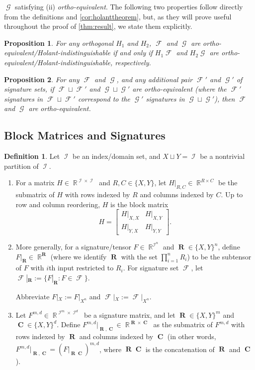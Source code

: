 \documentclass{article}
\newtheorem{proposition}{Proposition}[section]
\theoremstyle{remark}
\theoremstyle{definition}
\newtheorem{definition}{Definition}[section]
\DeclareMathOperator{\rr}{\mathbb{R}}
\DeclareMathOperator{\vr}{\mathbf{R}}
\DeclareMathOperator{\vc}{\mathbf{C}}
\DeclareMathOperator{\ic}{\mathcal{I}}
\DeclareMathOperator{\fc}{\mathcal{F}}
\DeclareMathOperator{\gc}{\mathcal{G}}
\begin{document}
$\gc$ satisfying (ii) \emph{ortho-equivalent}. 
The following two properties follow directly from the definitions and \autoref{cor:holanttheorem},
but, as they will
prove useful throughout the proof of \autoref{thm:result}, we state them explicitly.
\begin{proposition}
    For any orthogonal $H_1$ and $H_2$, $\fc$ and $\gc$ are 
    ortho-equivalent/Holant-indistinguishable if and only if
    $H_1\fc$ and $H_2\gc$ are ortho-equivalent/Holant-indistinguishable, respectively.
    \label{prop:transform}
\end{proposition}
\begin{proposition}
    For any $\fc$ and $\gc$, and any additional pair $\fc'$ and $\gc'$ of signature sets,
    if $\fc \sqcup \fc'$ and $\gc \sqcup \gc'$ are ortho-equivalent (where the $\fc'$ signatures in $\fc \sqcup \fc'$ correspond to the $\gc'$ signatures in $\gc \sqcup \gc'$), then $\fc$ and $\gc$ are ortho-equivalent.
    \label{prop:union}
\end{proposition}   

\subsection{Block Matrices and Signatures}
\label{sec:block}
\begin{definition}
    \label{def:block}
    Let $\ic$ be an index/domain set, and $X \sqcup Y = \ic$ be a nontrivial partition of $\ic$.
    \begin{enumerate}
    \item
    For a matrix $H \in \rr^{\ic \times \ic}$ and $R,C \in \{X,Y\}$, let $H|_{R,C} \in \rr^{R\times C}$ be the
    submatrix of $H$ with rows indexed by $R$ and columns indexed by $C$. Up to row and
    column reordering, $H$ is the block matrix
    \[
        H = \begin{bmatrix} H|_{X,X} & H|_{X,Y} \\ H|_{Y,X} & H|_{Y,Y}\end{bmatrix}.
    \]
    \item
    More generally, for a signature/tensor $F \in \rr^{\ic^n}$ and $\vr \in \{X,Y\}^n$, define
    $F|_{\vr} \in \rr^{\vr}$ (where we identify $\vr$ with the set $\prod_{i=1}^n R_i$) to be the subtensor of $F$ with $i$th
    input restricted to $R_i$.
    For signature set $\fc$, let $\fc|_{\vr} := \{F|_{\vr}: F \in \fc\}$.

    Abbreviate $F|_X := F|_{X^n}$ and $\fc|_X := \fc|_{X^n}$.
    \item 
    Let $F^{m,d} \in \rr^{\ic^m \times \ic^d}$ be a signature matrix, and let 
    $\vr \in \{X,Y\}^m$ and $\vc \in \{X,Y\}^d$. Define 
    $F^{m,d}|_{\vr,\vc} \in \rr^{\vr \times \vc}$
    as the submatrix of $F^{m,d}$ with rows indexed by $\vr$ and columns indexed by
    $\vc$ (in other words, $F^{m,d}|_{\vr,\vc} = (F|_{\vr\vc})^{m,d}$, where
    $\vr\vc$ is the concatenation of $\vr$ and $\vc$).
    \end{enumerate}
\end{definition}
\end{document}
